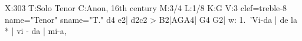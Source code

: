 X:303
T:Solo Tenor
C:Anon, 16th century
M:3/4
L:1/8
K:G
V:3 clef=treble-8 name="Tenor" sname="T."
d4 e2| d2c2 > B2|AGA4| G4 G2|
w: 1.~'Vi-da | de la * | vi - da | mi-a,
